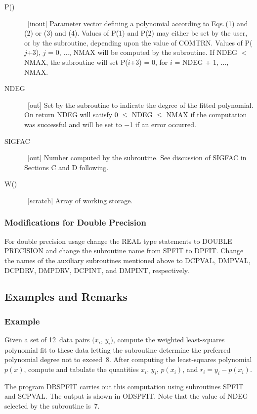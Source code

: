 \documentclass[twoside]{MATH77}
\begin{document}
\begin{description}
\item[P()]  \ [inout] Parameter vector defining a polynomial according to
Eqs.\,(1) and (2) or (3) and (4). Values of P(1) and P(2) may either be set
by the user, or by the subroutine, depending upon the value of COMTRN.
Values of P($j$+3), $j$ = 0, ..., NMAX will be computed by the subroutine. If
NDEG $<$ NMAX, the subroutine will set P($i$+3) = 0, for $i$ = NDEG + 1, ...,
NMAX.

\item[NDEG]  \ [out] Set by the subroutine to indicate the degree of the
fitted polynomial. On return NDEG will satisfy 0 $\leq $ NDEG $\leq $ NMAX
if the computation was successful and will be set to $-$1 if an error occurred.

\item[SIGFAC]  \ [out] Number computed by the subroutine. See discussion of
SIGFAC in Sections C and D following.

\item[W()]  \ [scratch] Array of working storage.
\end{description}
\subsubsection{Modifications for Double Precision}

For double precision usage change the REAL type statements to DOUBLE
PRECISION and change the subroutine name from SPFIT to DPFIT. Change the
names of the auxiliary subroutines mentioned above to DCPVAL, DMPVAL,
DCPDRV, DMPDRV, DCPINT, and DMPINT, respectively.

\subsection{Examples and Remarks}

\subsubsection{Example}

Given a set of 12~data pairs $(x_i$, $y_i)$, compute the
weighted least-squares polynomial fit to these data letting the subroutine
determine the preferred polynomial degree not to exceed~8. After computing
the least-squares polynomial $p(x)$, compute and tabulate the quantities $%
x_i $, $y_i$, $p(x_i)$, and $r_i = y_i - p(x_i).$

The program DRSPFIT carries out this computation using subroutines SPFIT and
SCPVAL. The output is shown in ODSPFIT. Note that the value of NDEG selected
by the subroutine is~7.
\end{document}
